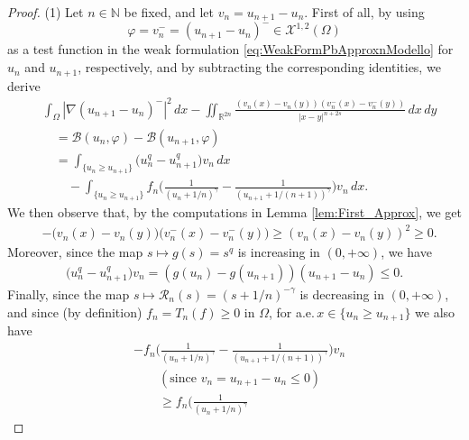 \documentclass[11pt,a4paper]{amsart}
\def \R {\mathbb{R}}
\theoremstyle{definition}
\theoremstyle{plain}
\numberwithin{equation}{section}
\begin{document}
{\begin{proof}
	(1)\,\,Let $n\in\mathbb{N}$ be fixed, and let $v_n = u_{n+1}-u_n$.
	First of all,
	by using 
	$$\varphi = v_n^- = (u_{n+1}-u_n)^-\in\mathcal{X}^{1,2}(\Omega)$$
	as a test func\-tion in the weak formulation \eqref{eq:WeakFormPbApproxnModello}
	for $u_n$ and $u_{n+1}$, respectively,
	and by subtracting the corresponding identities, we derive 
	\begin{equation} \label{eq:doveusareisegniMonotone}
		\begin{split}
			& \int_{\Omega}|\nabla(u_{n+1}-u_n)^-|^2\,dx
			- \iint_{\R^{2n}}\frac{(v_n(x)-v_n(y))(v_n^-(x)-v_n^-(y))}{|x-y|^{n+2s}}\,dx\,dy
			\\
			&\quad = \mathcal{B}(u_n,\varphi)-\mathcal{B}(u_{n+1},\varphi)
			\\
			& \quad
			= \int_{\{u_n\geq u_{n+1}\}}\big(u_n^q-u_{n+1}^q\big)v_n\,dx\\
			&\quad\quad -\int_{\{u_n\geq u_{n+1}\}}f_n\Big(\frac{1}{(u_n+1/n)^\gamma}
			- \frac{1}{(u_{n+1}+1/(n+1))^\gamma}\Big)v_n\,dx.
		\end{split}
	\end{equation}
	We then observe that, by the computations in Lemma \ref{lem:First_Approx}, we get
	\begin{equation} \label{eq:nonlocalsignMonotone}
		\begin{split}
			& -\big(v_n(x)-v_n(y)\big)\big(v_n^-(x)-v_n^-(y)\big)
			\geq (v_n(x)-v_n(y))^2\geq 0.
		\end{split}
	\end{equation}
	Moreover, since the map $s\mapsto g(s) = s^q$ is increasing in $(0,+\infty)$, we have
	\begin{equation} \label{eq:signuqMonotone}
		\begin{split}
			\big(u_n^q-u_{n+1}^q\big)v_n = (g(u_n)-g(u_{n+1}))(u_{n+1}-u_{n})\leq 0.
		\end{split}
	\end{equation}
	Finally, since the map $s\mapsto\mathcal{R}_{n}(s) = (s+1/n)^{-\gamma}$ is decreasing
	in $(0,+\infty)$, and since (by definition) $f_n = T_n(f)\geq 0$ in $\Omega$,
	for a.e.\,$x\in\{u_n\geq u_{n+1}\}$ we also have
	\begin{equation} \label{eq:singSingularMonotone}
		\begin{split}
			& -f_n\Big(\frac{1}{(u_n+1/n)^\gamma}
			- \frac{1}{(u_{n+1}+1/(n+1))^\gamma}\Big)v_n \\[0.2cm]
			& \qquad (\text{since $v_n = u_{n+1}-u_{n}\leq 0$}) \\
			& \qquad \geq f_n\Big(\frac{1}{(u_n+1/n)^\gamma}

\end{split}
\end{equation}
\end{proof}}
\end{document}
